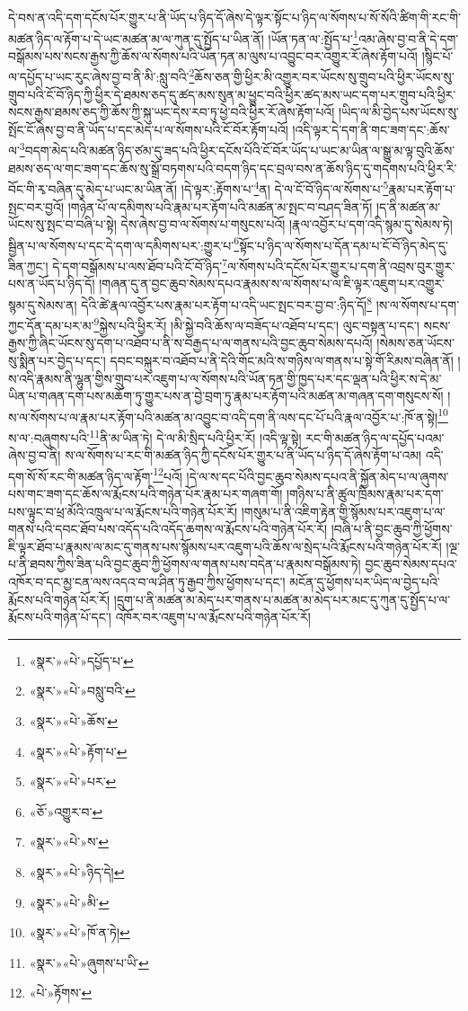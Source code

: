 དེ་བས་ན་འདི་དག་དངོས་པོར་གྱུར་པ་ནི་ཡོད་པ་ཉིད་དོ་ཞེས་དེ་ལྟར་སྟོང་པ་ཉིད་ལ་སོགས་པ་སོ་སོའི་ཚིག་གི་རང་གི་མཚན་ཉིད་ལ་རྟོག་པ་དེ་ཡང་མཚན་མ་ལ་ཀུན་དུ་སྤྱོད་པ་ཡིན་ནོ། །ཡོན་ཏན་ལ་:སྤྱོད་པ་\footnote{«སྣར་»«པེ་»དཔྱོད་པ་}འམ་ཞེས་བྱ་བ་ནི་དེ་དག་བསྒོམས་པས་སངས་རྒྱས་ཀྱི་ཆོས་ལ་སོགས་པའི་ཡོན་ཏན་མ་ལུས་པ་འབྱུང་བར་འགྱུར་རོ་ཞེས་རྟོག་པའོ། །སྙིང་པོ་ལ་དཔྱོད་པ་ཡང་རུང་ཞེས་བྱ་བ་ནི་མི་:སླུ་བའི་\footnote{«སྣར་»«པེ་»བསླུ་བའི་}ཆོས་ཅན་གྱི་ཕྱིར་མི་འགྱུར་བར་ཡོངས་སུ་གྲུབ་པའི་ཕྱིར་ཡོངས་སུ་གྲུབ་པའི་ངོ་བོ་ཉིད་ཀྱི་ཕྱིར་དེ་ཐམས་ཅད་དུ་ཚད་མས་སུན་མ་ཕྱུང་བའི་ཕྱིར་ཚད་མས་ཡང་དག་པར་གྲུབ་པའི་ཕྱིར་སངས་རྒྱས་ཐམས་ཅད་ཀྱི་ཆོས་ཀྱི་སྐུ་ཡང་དེས་རབ་ཏུ་ཕྱེ་བའི་ཕྱིར་རོ་ཞེས་རྟོག་པའོ། །ཡིད་ལ་མི་བྱེད་པས་ཡོངས་སུ་སྤོང་ངོ་ཞེས་བྱ་བ་ནི་ཡོད་པ་དང་མེད་པ་ལ་སོགས་པའི་ངོ་བོར་རྟོག་པའོ། །འདི་ལྟར་དེ་དག་ནི་གང་ཟག་དང་:ཆོས་ལ་\footnote{«སྣར་»«པེ་»ཆོས་}བདག་མེད་པའི་མཚན་ཉིད་ཙམ་དུ་ཟད་པའི་ཕྱིར་དངོས་པོའི་ངོ་བོར་ཡོད་པ་ཡང་མ་ཡིན་ལ་སྒྱུ་མ་ལྟ་བུའི་ཆོས་ཐམས་ཅད་ལ་གང་ཟག་དང་ཆོས་སུ་སྒྲོ་བཏགས་པའི་བདག་ཉིད་དང་བྲལ་བས་ན་ཆོས་ཉིད་དུ་གདགས་པའི་ཕྱིར་རི་བོང་གི་རྭ་བཞིན་དུ་མེད་པ་ཡང་མ་ཡིན་ནོ། །དེ་ལྟར་:རྟོགས་པ་\footnote{«སྣར་»«པེ་»རྟོག་པ་}ན། དེ་ལ་ངོ་བོ་ཉིད་ལ་སོགས་པ་\footnote{«སྣར་»«པེ་»པར་}རྣམ་པར་རྟོག་པ་སྤང་བར་བྱའོ། །གཉེན་པོ་ལ་དམིགས་པའི་རྣམ་པར་རྟོག་པའི་མཚན་མ་སྤང་བ་བཤད་ཟིན་ཏོ། །ད་ནི་མཚན་མ་ཡོངས་སུ་སྤང་བ་བཞི་པ་སྟེ། དེས་ཞེས་བྱ་བ་ལ་སོགས་པ་གསུངས་པའོ། །རྣལ་འབྱོར་པ་དག་འདི་སྙམ་དུ་སེམས་ཏེ། སྦྱིན་པ་ལ་སོགས་པ་དང་དེ་དག་ལ་དམིགས་པར་:གྱུར་པ་\footnote{«ཅོ་»འགྱུར་བ་}སྟོང་པ་ཉིད་ལ་སོགས་པ་དོན་དམ་པ་ངོ་བོ་ཉིད་མེད་དུ་ཟིན་ཀྱང་། དེ་དག་བསྒོམས་པ་ལས་ཐོབ་པའི་ངོ་བོ་ཉིད་\footnote{«སྣར་»«པེ་»ས་}ལ་སོགས་པའི་དངོས་པོར་གྱུར་པ་དག་ནི་འབྲས་བུར་གྱུར་པས་ན་ཡོད་པ་ཉིད་དོ། །གཞན་དུ་ན་བྱང་ཆུབ་སེམས་དཔའ་རྣམས་ས་ལ་སོགས་པ་ལ་ཇི་ལྟར་འཇུག་པར་འགྱུར་སྙམ་དུ་སེམས་ན། དེའི་ཚེ་རྣལ་འབྱོར་པས་རྣམ་པར་རྟོག་པ་འདི་ཡང་སྤང་བར་བྱ་བ་:ཉིད་དོ།\footnote{«སྣར་»«པེ་»ཉིད་དེ།} །ས་ལ་སོགས་པ་དག་ཀྱང་དོན་དམ་པར་མ་\footnote{«སྣར་»«པེ་»མི་}སྐྱེས་པའི་ཕྱིར་རོ། །མི་སྐྱེ་བའི་ཆོས་ལ་བཟོད་པ་འཐོབ་པ་དང་། ལུང་བསྟན་པ་དང་། སངས་རྒྱས་ཀྱི་ཞིང་ཡོངས་སུ་དག་པ་འཐོབ་པ་ནི་ས་བརྒྱད་པ་ལ་གནས་པའི་བྱང་ཆུབ་སེམས་དཔའོ། །སེམས་ཅན་ཡོངས་སུ་སྨིན་པར་བྱེད་པ་དང་། དབང་བསྐུར་བ་འཐོབ་པ་ནི་དེའི་གོང་མའི་ས་གཉིས་ལ་གནས་པ་སྟེ་གོ་རིམས་བཞིན་ནོ། །ས་འདི་རྣམས་ནི་ལྷུན་གྱིས་གྲུབ་པར་འཇུག་པ་ལ་སོགས་པའི་ཡོན་ཏན་གྱི་ཁྱད་པར་དང་ལྡན་པའི་ཕྱིར་ས་དེ་མ་ཡིན་པ་གཞན་དག་པས་མཆོག་ཏུ་གྱུར་པས་ན་བྱེ་བྲག་ཏུ་རྣམ་པར་རྟོག་པའི་མཚན་མ་གཞན་དག་གསུངས་སོ། །ས་ལ་སོགས་པ་ལ་རྣམ་པར་རྟོག་པའི་མཚན་མ་འབྱུང་བ་འདི་དག་ནི་ལས་དང་པོ་པའི་རྣལ་འབྱོར་པ་:ཁོ་ན་སྟེ།\footnote{«སྣར་»«པེ་»ཁོ་ན་ཏེ།} ས་ལ་:བཞུགས་པའི་\footnote{«སྣར་»«པེ་»ཞུགས་པ་ཡི་}ནི་མ་ཡིན་ཏེ། དེ་ལ་མི་སྲིད་པའི་ཕྱིར་རོ། །འདི་ལྟ་སྟེ། རང་གི་མཚན་ཉིད་ལ་དཔྱོད་པའམ་ཞེས་བྱ་བ་ནི། ས་ལ་སོགས་པ་རང་གི་མཚན་ཉིད་ཀྱི་དངོས་པོར་གྱུར་པ་ནི་ཡོད་པ་ཉིད་དོ་ཞེས་རྟོག་པ་འམ། འདི་དག་སོ་སོ་རང་གི་མཚན་ཉིད་ལ་རྟོག་\footnote{«པེ་»རྟོགས་}པའོ། །དེ་ལ་ས་དང་པོའི་བྱང་ཆུབ་སེམས་དཔའ་ནི་སྐྱོན་མེད་པ་ལ་ཞུགས་པས་གང་ཟག་དང་ཆོས་ལ་རྨོངས་པའི་གཉེན་པོར་རྣམ་པར་གཞག་གོ། །གཉིས་པ་ནི་ཚུལ་ཁྲིམས་རྣམ་པར་དག་པས་ལྟུང་བ་ཕྲ་མོའི་འཁྲུལ་པ་ལ་རྨོངས་པའི་གཉེན་པོར་རོ། །གསུམ་པ་ནི་འཇིག་རྟེན་གྱི་སྙོམས་པར་འཇུག་པ་ལ་གནས་པའི་དབང་ཐོབ་པས་འདོད་པའི་འདོད་ཆགས་ལ་རྨོངས་པའི་གཉེན་པོར་རོ། །བཞི་པ་ནི་བྱང་ཆུབ་ཀྱི་ཕྱོགས་ཇི་ལྟར་ཐོབ་པ་རྣམས་ལ་མང་དུ་གནས་པས་སྙོམས་པར་འཇུག་པའི་ཆོས་ལ་སྲེད་པའི་རྨོངས་པའི་གཉེན་པོར་རོ། །ལྔ་པ་ནི་ཐབས་ཀྱིས་ཟིན་པའི་བྱང་ཆུབ་ཀྱི་ཕྱོགས་ལ་གནས་པས་བདེན་པ་རྣམས་བསྒོམས་ཏེ། བྱང་ཆུབ་སེམས་དཔའ་འཁོར་བ་དང་མྱ་ངན་ལས་འདའ་བ་ལ་ཤིན་ཏུ་རྒྱབ་ཀྱིས་ཕྱོགས་པ་དང་། མངོན་དུ་ཕྱོགས་པར་ཡིད་ལ་བྱེད་པའི་རྨོངས་པའི་གཉེན་པོར་རོ། །དྲུག་པ་ནི་མཚན་མ་མེད་པར་གནས་པ་མཚན་མ་མེད་པར་མང་དུ་ཀུན་དུ་སྤྱོད་པ་ལ་རྨོངས་པའི་གཉེན་པོ་དང་། འཁོར་བར་འཇུག་པ་ལ་རྨོངས་པའི་གཉེན་པོར་རོ། 